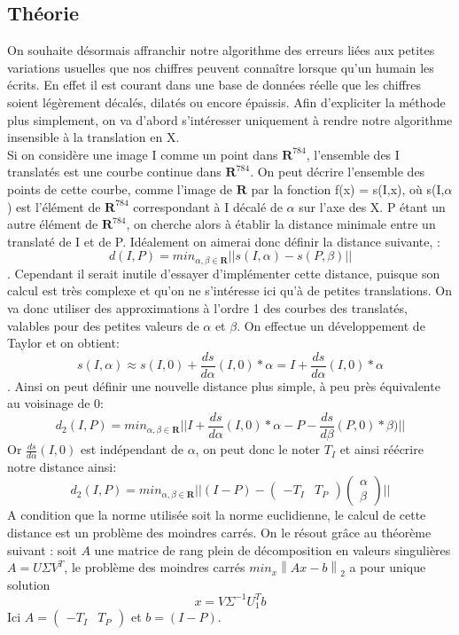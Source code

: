 \documentclass[a4paper,11pt,twoside]{report}
\newcommand{\norm}[1]{\left\lVert#1\right\rVert} %
\begin{document}
\subsection{Théorie}
On souhaite désormais affranchir notre algorithme des erreurs liées aux petites variations usuelles que nos chiffres peuvent connaître lorsque qu'un humain les écrits. En effet il est courant dans une base de données réelle que les chiffres soient légèrement décalés, dilatés ou encore épaissis. Afin d'expliciter la méthode plus simplement, on va d'abord s’intéresser uniquement à rendre notre algorithme insensible à la translation en X. \\
Si on considère une image I comme un point dans $\textbf{R}^{784}$, l'ensemble des I translatés est une courbe continue dans $\textbf{R}^{784}$. On peut décrire l'ensemble des points de cette courbe, comme l'image de $\textbf{R}$ par la fonction f(x) = s(I,x), où s(I,$\alpha$) est l'élément de  $\textbf{R}^{784}$ correspondant à I décalé de $\alpha$ sur l'axe des X. P étant un autre élément de $\textbf{R}^{784}$, on cherche alors à établir la distance minimale entre un translaté de I et de P. Idéalement on aimerai donc définir la distance suivante, : $$d(I,P)= min_{\alpha,\beta \in \textbf{R}} ||s(I,\alpha)-s(P,\beta)||$$. 
Cependant il serait inutile d'essayer d'implémenter cette distance, puisque son calcul est très complexe et qu'on ne s’intéresse ici qu'à de petites translations. On va donc utiliser des approximations à l'ordre 1 des courbes des translatés, valables pour des petites valeurs de $\alpha$ et $\beta$. On effectue un développement de Taylor et on obtient:$$s(I,\alpha)\approx s(I,0) + \frac{ds}{d\alpha}(I,0)*\alpha=I + \frac{ds}{d\alpha}(I,0)*\alpha$$.
Ainsi on peut définir une nouvelle distance plus simple, à peu près équivalente au voisinage de 0: $$d_{2}(I,P)= min_{\alpha,\beta \in \textbf{R}} ||I+\frac{ds}{d\alpha}(I,0)*\alpha-P-\frac{ds}{d\beta}(P,0)*\beta)||$$
Or $\frac{ds}{d\alpha}(I,0)$ est indépendant de $\alpha$, on peut donc le noter $T_{I}$ et ainsi réécrire notre distance ainsi: $$d_{2}(I,P)= min_{\alpha,\beta \in \textbf{R}} ||(I-P)-\begin{pmatrix}-T_{I} & T_{P}\end{pmatrix} \begin{pmatrix}\alpha \\ \beta\end{pmatrix} ||$$ 
A condition que la norme utilisée soit la norme euclidienne, le calcul de cette distance est un problème des moindres carrés. On le résout grâce au théorème suivant : soit $A$ une matrice de rang plein de décomposition en valeurs singulières $A = U\Sigma V^T$, le problème des moindres carrés $min_x\norm{Ax-b}_2$ a pour unique solution $$x = V\Sigma^{-1}U_1^Tb$$ Ici $A = \begin{pmatrix}-T_{I} & T_{P}\end{pmatrix}$ et $b = (I-P)$.\\
\end{document}
